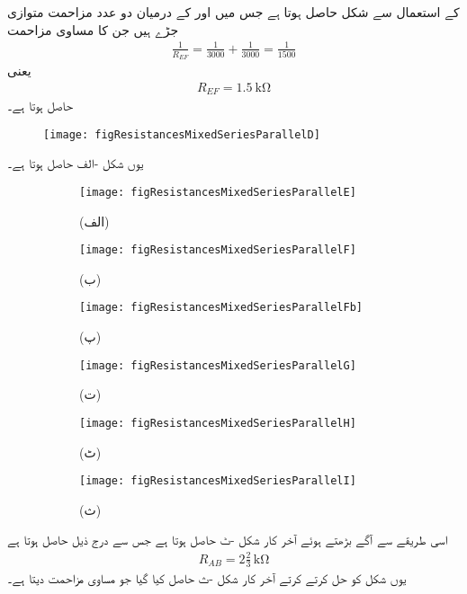  کے استعمال سے شکل   حاصل ہوتا ہے جس میں  اور  کے درمیان دو عدد  مزاحمت متوازی جڑے ہیں جن کا مساوی مزاحمت
\begin{align*}
\frac{1}{R_{EF}}=\frac{1}{3000}+\frac{1}{3000}=\frac{1}{1500}
\end{align*}
یعنی
\begin{align*}
R_{EF}=\SI{1.5}{\kilo\ohm}
\end{align*}
حاصل ہوتا ہے۔
\begin{figure}
\centering
\texttt{[image: figResistancesMixedSeriesParallelD]}
\caption{}
\label{مشق_مزاحمتی_سلسلہ_وار_متوازی_مزاحمت_پ}
\end{figure}
یوں شکل -الف حاصل ہوتا ہے۔
\begin{figure}
\centering
\begin{subfigure}{0.5\textwidth}
\centering
\texttt{[image: figResistancesMixedSeriesParallelE]}
\caption*{(الف)}
\end{subfigure}%
\begin{subfigure}{0.5\textwidth}
\centering
\texttt{[image: figResistancesMixedSeriesParallelF]}
\caption*{(ب)}
\end{subfigure}
%
\begin{subfigure}{0.5\textwidth}
\centering
\texttt{[image: figResistancesMixedSeriesParallelFb]}
\caption*{(پ)}
\end{subfigure}%
\begin{subfigure}{0.5\textwidth}
\centering
\texttt{[image: figResistancesMixedSeriesParallelG]}
\caption*{(ت)}
\end{subfigure}
%
\begin{subfigure}{0.5\textwidth}
\centering
\texttt{[image: figResistancesMixedSeriesParallelH]}
\caption*{(ٹ)}
\end{subfigure}%
\begin{subfigure}{0.5\textwidth}
\centering
\texttt{[image: figResistancesMixedSeriesParallelI]}
\caption*{(ث)}
\end{subfigure}%
\caption{}
\label{مشق_مزاحمتی_سلسلہ_وار_متوازی_مزاحمت_ت}
\end{figure}
اسی طریقے سے آگے بڑھتے ہوئے آخر کار شکل -ٹ حاصل ہوتا ہے جس سے  درج ذیل حاصل ہوتا ہے
\begin{align*}
R_{AB}=2\frac{2}{3}\, \si{\kilo\ohm}
\end{align*}
یوں شکل   کو حل کرتے کرتے آخر کار  شکل -ث حاصل کیا گیا جو مساوی مزاحمت  دیتا  ہے۔

